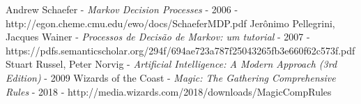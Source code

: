 \documentclass[dvipsnames]{book}
\begin{document}






\newpage




\begin{thebibliography}{1}
  Andrew Schaefer - {\em Markov Decision Processes} - 2006 - http://egon.cheme.cmu.edu/ewo/docs/SchaeferMDP.pdf
  Jerônimo Pellegrini, Jacques Wainer - {\em Processos de Decisão de Markov: um tutorial} - 2007 - https://pdfs.semanticscholar.org/294f/694ae723a787f25043265fb3e660f62c573f.pdf
  Stuart Russel, Peter Norvig - {\em Artificial Intelligence: A Modern Approach (3rd Edition)} - 2009
  Wizards of the Coast - {\em Magic: The Gathering Comprehensive Rules} - 2018 - http://media.wizards.com/2018/downloads/MagicCompRules%
\end{thebibliography}
\end{document}
